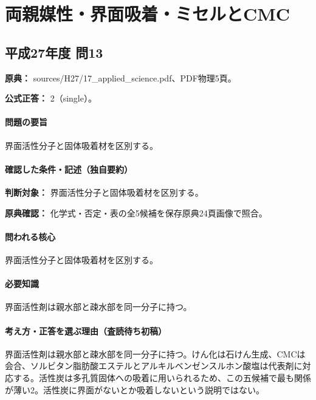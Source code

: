 \section{両親媒性・界面吸着・ミセルとCMC}

\subsection{平成27年度 問13}
\label{q:h27-reg-applied-13}

\noindent\textbf{原典：} sources/H27/17\_applied\_science.pdf、PDF物理5頁。

\textbf{公式正答：} 2（single）。

\paragraph{問題の要旨} 界面活性分子と固体吸着材を区別する。

\paragraph{確認した条件・記述（独自要約）}\mbox{}\par

\noindent\textbf{判断対象：} 界面活性分子と固体吸着材を区別する。\par

\noindent\textbf{原典確認：} 化学式・否定・表の全5候補を保存原典24頁画像で照合。\par

\paragraph{問われる核心} 界面活性分子と固体吸着材を区別する。

\paragraph{必要知識} 界面活性剤は親水部と疎水部を同一分子に持つ。

\paragraph{考え方・正答を選ぶ理由（査読待ち初稿）} 界面活性剤は親水部と疎水部を同一分子に持つ。けん化は石けん生成、CMCは会合、ソルビタン脂肪酸エステルとアルキルベンゼンスルホン酸塩は代表剤に対応する。活性炭は多孔質固体への吸着に用いられるため、この五候補で最も関係が薄い2。活性炭に界面がないとか吸着しないという説明ではない。

